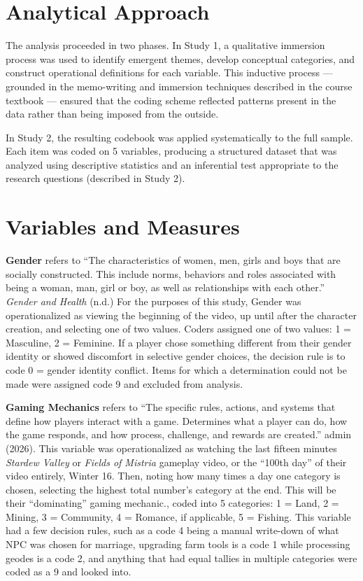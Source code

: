 \documentclass[
  12pt,
  letterpaper,
  DIV=11,
  numbers=noendperiod]{scrreprt}
\begin{document}
\section{Analytical Approach}\label{analytical-approach}

The analysis proceeded in two phases. In Study 1, a qualitative
immersion process was used to identify emergent themes, develop
conceptual categories, and construct operational definitions for each
variable. This inductive process --- grounded in the memo-writing and
immersion techniques described in the course textbook --- ensured that
the coding scheme reflected patterns present in the data rather than
being imposed from the outside.

In Study 2, the resulting codebook was applied systematically to the
full sample. Each item was coded on 5 variables, producing a structured
dataset that was analyzed using descriptive statistics and an
inferential test appropriate to the research questions (described in
Study 2).

\section{Variables and Measures}\label{variables-and-measures}

\textbf{Gender} refers to ``The characteristics of women, men, girls and
boys that are socially constructed. This include norms, behaviors and
roles associated with being a woman, man, girl or boy, as well as
relationships with each other.'' \emph{Gender and Health} (n.d.) For the
purposes of this study, Gender was operationalized as viewing the
beginning of the video, up until after the character creation, and
selecting one of two values. Coders assigned one of two values: 1 =
Masculine, 2 = Feminine. If a player chose something different from
their gender identity or showed discomfort in selective gender choices,
the decision rule is to code 0 = gender identity conflict. Items for
which a determination could not be made were assigned code 9 and
excluded from analysis.

\textbf{Gaming Mechanics} refers to ``The specific rules, actions, and
systems that define how players interact with a game. Determines what a
player can do, how the game responds, and how process, challenge, and
rewards are created.'' {admin} (2026). This variable was operationalized
as watching the last fifteen minutes \emph{Stardew Valley} or
\emph{Fields of Mistria} gameplay video, or the ``100th day'' of their
video entirely, Winter 16. Then, noting how many times a day one
category is chosen, selecting the highest total number's category at the
end. This will be their ``dominating'' gaming mechanic., coded into 5
categories: 1 = Land, 2 = Mining, 3 = Community, 4 = Romance, if
applicable, 5 = Fishing. This variable had a few decision rules, such as
a code 4 being a manual write-down of what NPC was chosen for marriage,
upgrading farm tools is a code 1 while processing geodes is a code 2,
and anything that had equal tallies in multiple categories were coded as
a 9 and looked into.
\end{document}
